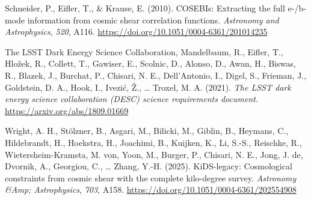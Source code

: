 \documentclass[
]{article}
\newlength{\cslhangindent}
\newenvironment{CSLReferences}[2] %
 {\begin{list}{}{%
  \setlength{\itemindent}{0pt}
  \setlength{\leftmargin}{0pt}
  \setlength{\parsep}{0pt}
  \ifodd #1
   \setlength{\leftmargin}{\cslhangindent}
   \setlength{\itemindent}{-1\cslhangindent}
  \fi
  \setlength{\itemsep}{#2\baselineskip}}}
 {\end{list}}
\begin{document}
\begin{CSLReferences}{1}{0}
Schneider, P., Eifler, T., \& Krause, E. (2010). COSEBIs: Extracting the
full e-/b-mode information from cosmic shear correlation functions.
\emph{Astronomy and Astrophysics}, \emph{520}, A116.
\url{https://doi.org/10.1051/0004-6361/201014235}

The LSST Dark Energy Science Collaboration, Mandelbaum, R., Eifler, T.,
Hložek, R., Collett, T., Gawiser, E., Scolnic, D., Alonso, D., Awan, H.,
Biswas, R., Blazek, J., Burchat, P., Chisari, N. E., Dell'Antonio, I.,
Digel, S., Frieman, J., Goldstein, D. A., Hook, I., Ivezić, Ž., \ldots{}
Troxel, M. A. (2021). \emph{The LSST dark energy science collaboration
(DESC) science requirements document}.
\url{https://arxiv.org/abs/1809.01669}

Wright, A. H., Stölzner, B., Asgari, M., Bilicki, M., Giblin, B.,
Heymans, C., Hildebrandt, H., Hoekstra, H., Joachimi, B., Kuijken, K.,
Li, S.-S., Reischke, R., Wietersheim-Kramsta, M. von, Yoon, M., Burger,
P., Chisari, N. E., Jong, J. de, Dvornik, A., Georgiou, C., \ldots{}
Zhang, Y.-H. (2025). KiDS-legacy: Cosmological constraints from cosmic
shear with the complete kilo-degree survey. \emph{Astronomy \&Amp;
Astrophysics}, \emph{703}, A158.
\url{https://doi.org/10.1051/0004-6361/202554908}

\end{CSLReferences}
\end{document}
